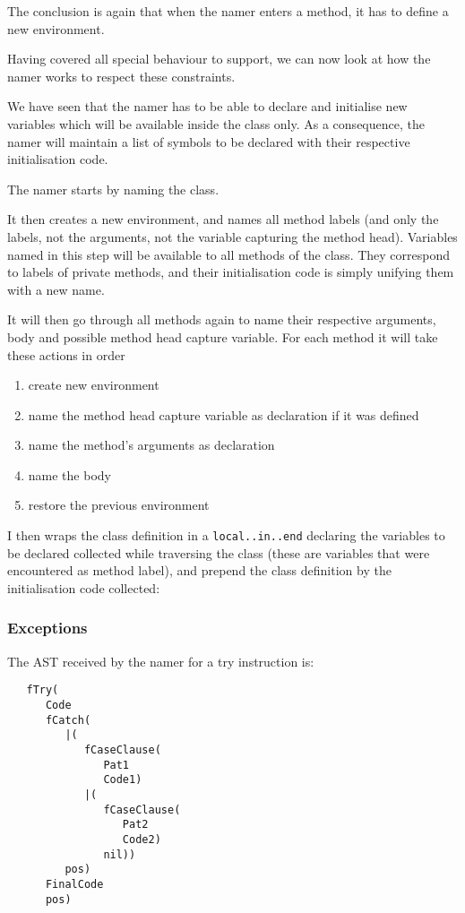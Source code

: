 \documentclass[a4paper]{memoir}
\begin{document}
The conclusion is again that when the namer enters a method, it has to define a new environment.

Having covered all special behaviour to support, we can now look at how the namer works to 
respect these constraints.

We have seen that the namer has to be able to declare and initialise new
variables which will be available inside the class only. As a consequence, the
namer will maintain a list of symbols to be declared with their respective
initialisation code.

The namer starts by naming the class.

It then creates a new environment, and names all method labels (and only the
labels, not the arguments, not the variable capturing the method head).
Variables named in this step will be available to all methods of the class.
They correspond to labels of private methods, and their initialisation code is
simply unifying them with a new name.

It will then go through all methods again to name their respective arguments,
body and possible method head capture variable. For each method it will take
these actions in order
\begin{enumerate}
  \item create new environment
  \item name the method head capture variable as declaration if it was defined
  \item name the method's arguments as declaration
  \item name the body
  \item restore the previous environment
\end{enumerate}

I then wraps the class definition in a \lstinline!local..in..end! declaring the
variables to be declared collected while traversing the class (these are
variables that were encountered as method label), and prepend the class
definition by the initialisation code collected:


\subsubsection{Exceptions}\label{sec:arch:namer:exceptions}
The AST received by the namer for a try instruction is:
\begin{lstlisting}
   fTry(
      Code
      fCatch(
         |(
            fCaseClause(
               Pat1
               Code1)
            |(
               fCaseClause(
                  Pat2
                  Code2)
               nil))
         pos)
      FinalCode
      pos)
\end{lstlisting}
\end{document}
